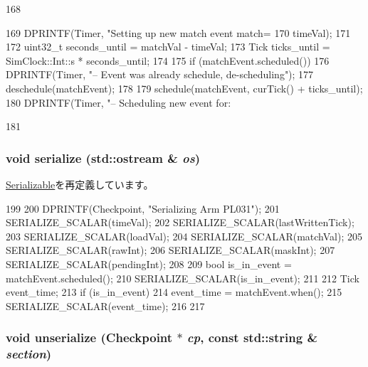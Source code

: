 \begin{DoxyCode}
168 {
169     DPRINTF(Timer, "Setting up new match event match=%
170             timeVal);
171 
172     uint32_t seconds_until = matchVal - timeVal;
173     Tick ticks_until = SimClock::Int::s * seconds_until;
174 
175     if (matchEvent.scheduled()) {
176         DPRINTF(Timer, "-- Event was already schedule, de-scheduling\n");
177         deschedule(matchEvent);
178     }
179     schedule(matchEvent, curTick() + ticks_until);
180     DPRINTF(Timer, "-- Scheduling new event for: %
      
181 }
\end{DoxyCode}
\hypertarget{classPL031_a53e036786d17361be4c7320d39c99b84}{
\subsubsection[{serialize}]{\setlength{\rightskip}{0pt plus 5cm}void serialize (std::ostream \& {\em os})}}
\label{classPL031_a53e036786d17361be4c7320d39c99b84}


\hyperlink{classSerializable_ad6272f80ae37e8331e3969b3f072a801}{Serializable}を再定義しています。


\begin{DoxyCode}
199 {
200     DPRINTF(Checkpoint, "Serializing Arm PL031\n");
201     SERIALIZE_SCALAR(timeVal);
202     SERIALIZE_SCALAR(lastWrittenTick);
203     SERIALIZE_SCALAR(loadVal);
204     SERIALIZE_SCALAR(matchVal);
205     SERIALIZE_SCALAR(rawInt);
206     SERIALIZE_SCALAR(maskInt);
207     SERIALIZE_SCALAR(pendingInt);
208 
209     bool is_in_event = matchEvent.scheduled();
210     SERIALIZE_SCALAR(is_in_event);
211 
212     Tick event_time;
213     if (is_in_event){
214         event_time = matchEvent.when();
215         SERIALIZE_SCALAR(event_time);
216     }
217 }
\end{DoxyCode}
\hypertarget{classPL031_af22e5d6d660b97db37003ac61ac4ee49}{
\subsubsection[{unserialize}]{\setlength{\rightskip}{0pt plus 5cm}void unserialize ({\bf Checkpoint} $\ast$ {\em cp}, \/  const std::string \& {\em section})}}
\label{classPL031_af22e5d6d660b97db37003ac61ac4ee49}


